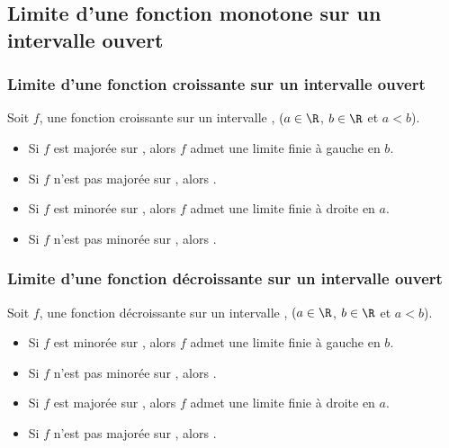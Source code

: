  \subsection{Limite d'une fonction monotone sur un intervalle ouvert}
\subsubsection{Limite d'une fonction croissante sur un intervalle ouvert}
\begin{propriete}
	Soit $f$, une fonction croissante sur un intervalle , $(a\in \R$, $b\in \R$ et $a<b$).
	\begin{itemize}
		\item[$\bullet$] Si $f$ est majorée sur , alors $f$ admet une limite finie à gauche en $b$.
		\item[$\bullet$] Si $f$ n'est pas majorée sur , alors .
		\item[$\bullet$] Si $f$ est minorée sur , alors $f$ admet une limite finie à droite en $a$.
		\item[$\bullet$] Si $f$ n'est pas minorée sur , alors .
	\end{itemize}
\end{propriete}
\subsubsection{Limite d'une fonction décroissante sur un intervalle ouvert}\vspace*{-0.3cm}
\begin{propriete}
	Soit $f$, une fonction décroissante sur un intervalle , $(a\in \R$, $b\in \R$ et $a<b$).
	\begin{itemize}
		\item[$\bullet$] Si $f$ est minorée sur , alors $f$ admet une limite finie à gauche en $b$.
		\item[$\bullet$] Si $f$ n'est pas minorée sur , alors .
		\item[$\bullet$] Si $f$ est majorée sur , alors $f$ admet une limite finie à droite en $a$.
		\item[$\bullet$] Si $f$ n'est pas majorée sur , alors .
	\end{itemize}
\end{propriete}
